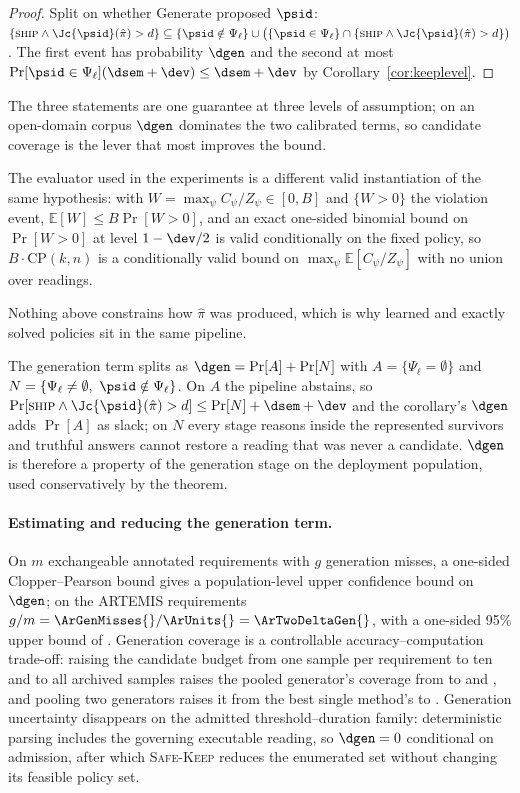 \begin{proof}
Split on whether Generate proposed $\psid$:
$\{\textsc{ship}\wedge\Jc{\psid}(\hat\pi)>d\}\subseteq
\{\psid\notin\Psi_\ell\}\cup
\big(\{\psid\in\Psi_\ell\}\cap\{\textsc{ship}\wedge\Jc{\psid}(\hat\pi)>d\}\big)$.
The first event has probability $\dgen$ and the second at most
$\Pr[\psid\in\Psi_\ell](\dsem+\dev)\le\dsem+\dev$ by
Corollary~\ref{cor:keeplevel}.
\end{proof}

\noindent The three statements are one guarantee at three levels of assumption; on an open-domain
corpus $\dgen$ dominates the two calibrated terms, so candidate coverage is the lever that most
improves the bound.

\noindent The evaluator used in the experiments is a different valid
instantiation of the same hypothesis: with $W=\max_\psi C_\psi/Z_\psi\in[0,B]$
and $\{W>0\}$ the violation event, $\mathbb E[W]\le B\Pr[W>0]$, and an
exact one-sided binomial bound on $\Pr[W>0]$ at level $1-\dev/2$ is valid
conditionally on the fixed policy, so $B\cdot\mathrm{CP}(k,n)$ is a
conditionally valid bound on $\max_\psi\mathbb E[C_\psi/Z_\psi]$ with no
union over readings.

\noindent Nothing above constrains how $\hat\pi$ was produced, which is why learned and
exactly solved policies sit in the same pipeline.

\noindent The generation term splits as $\dgen=\Pr[A]+\Pr[N]$ with $A=\{\Psi_\ell=\emptyset\}$ and
$N=\{\Psi_\ell\neq\emptyset,\ \psid\notin\Psi_\ell\}$. On $A$ the pipeline abstains, so
$\Pr[\textsc{ship}\wedge\Jc{\psid}(\hat\pi)>d]\le\Pr[N]+\dsem+\dev$ and the corollary's $\dgen$
adds $\Pr[A]$ as slack; on $N$ every stage reasons inside the represented survivors and truthful
answers cannot restore a reading that was never a candidate. $\dgen$ is therefore a property of
the generation stage on the deployment population, used conservatively by the theorem.

\paragraph{Estimating and reducing the generation term.} On $m$ exchangeable annotated
requirements with $g$ generation misses, a one-sided Clopper--Pearson bound gives a
population-level upper confidence bound on $\dgen$; on the ARTEMIS requirements
$g/m=\ArGenMisses{}/\ArUnits{}=\ArTwoDeltaGen{}$, with a one-sided 95\% upper bound of
\ArDgenUcb{}. Generation coverage is a controllable accuracy--computation trade-off:
raising the candidate budget from one sample per requirement to ten and to all archived
samples raises the pooled generator's coverage from \ArKOneAny{} to \ArKTenAny{} and
\AmPoolAll{}, and pooling two generators raises it from the best single method's
\AmBestSingleAll{} to \AmPoolAll{}. Generation uncertainty disappears on the admitted
threshold--duration family: deterministic parsing includes the governing executable reading,
so $\dgen=0$ conditional on admission, after which \textsc{Safe-Keep} reduces the enumerated
set without changing its feasible policy set.

